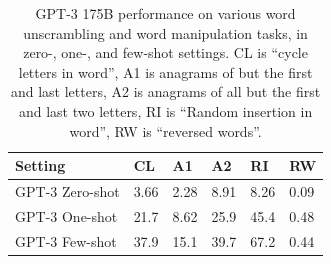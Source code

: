 \begin{table}
    \centering
        \begin{tabular}{l l l l l l}
        \toprule
        Setting & CL & A1 & A2 & RI & RW \\ 
        \midrule
        GPT-3 Zero-shot & 3.66 & 2.28 & 8.91 & 8.26 & 0.09 \\
        GPT-3 One-shot & 21.7 & 8.62 & 25.9 & 45.4 & 0.48 \\ 
        GPT-3 Few-shot & 37.9 & 15.1 & 39.7 & 67.2 & 0.44 \\ 
        \bottomrule
        \end{tabular}
    \caption{GPT-3 175B performance on various word unscrambling and word
manipulation tasks, in zero-, one-, and few-shot settings. CL is ``cycle letters in word'', A1 is anagrams of but the first and last letters,
A2 is anagrams of all but the first and last two letters, RI is ``Random insertion
in word'', RW is ``reversed words''.}
    \label{table:unscramble}
\end{table}
